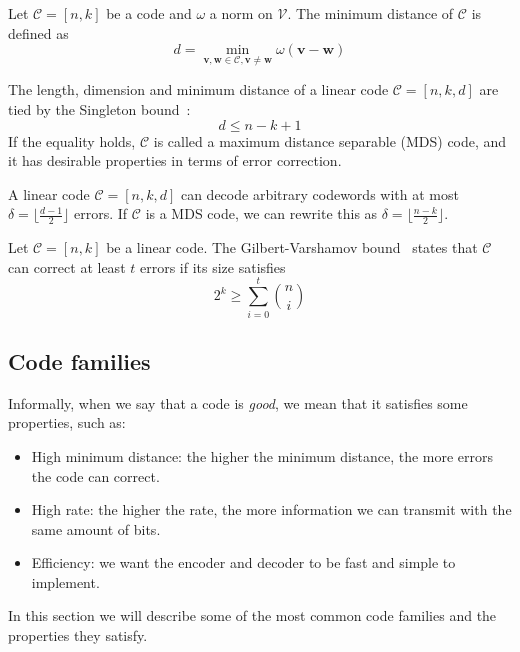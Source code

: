\begin{definition}
    Let $\mathcal{C} = [n,k]$ be a code and $\omega$ a norm on $\mathcal{V}$. The minimum distance of $\mathcal{C}$ is defined as
    \begin{equation*}
        d = \min_{\mathbf{v}, \mathbf{w} \in \mathcal{C}, \mathbf{v}\neq \mathbf{w}} \omega(\mathbf{v} - \mathbf{w})
    \end{equation*}
\end{definition}
The length, dimension and minimum distance of a linear code $\mathcal{C} = [n,k,d]$ are tied by the Singleton bound~\cite{DBLP:journals/tit/Singleton64}:
\begin{equation*}
    d \leqslant n-k+1
\end{equation*}
If the equality holds, $\mathcal{C}$ is called a maximum distance separable (MDS) code, and it has desirable properties in terms of error correction.

\begin{definition}
A linear code $\mathcal{C} = [n,k,d]$ can decode arbitrary codewords with at most $\delta = \lfloor \frac{d-1}{2}\rfloor$ errors.
If $\mathcal{C}$ is a MDS code, we can rewrite this as $\delta = \lfloor \frac{n-k}{2} \rfloor$.
\end{definition}

\begin{definition}
    Let $\mathcal{C} = [n,k]$ be a linear code. The Gilbert-Varshamov bound~\cite{gilbert1952comparison,varshamov1957estimate} 
    states that $\mathcal{C}$ can correct at least $t$ errors if its size satisfies
    \begin{equation}
        2^k \geqslant \sum_{i=0}^t \binom{n}{i} \label{eq:gv_bound}
    \end{equation}
\end{definition}

\subsection{Code families}
Informally, when we say that a code is \textit{good}, we mean that it satisfies some properties, such as:
\begin{itemize}
    \item High minimum distance: the higher the minimum distance, the more errors the code can correct.
    \item High rate: the higher the rate, the more information we can transmit with the same amount of bits.
    \item Efficiency: we want the encoder and decoder to be fast and simple to implement.
\end{itemize}
In this section we will describe some of the most common code families and the properties they satisfy.

